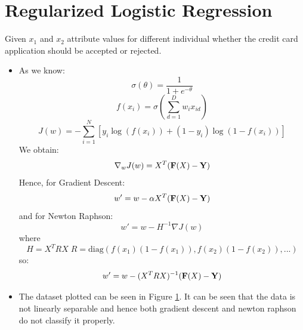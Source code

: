 \documentclass{article}
\begin{document}
\section{Regularized Logistic Regression}
Given $x_1$ and $x_2$ attribute values for different individual whether the credit card application should be accepted or rejected.
\begin{itemize}

\begin{figure}[H]
 \caption{Distribution of the dataset, the positive examples are in blue circles and negative examples in red crossed. The magenta line represents the class boundary obtained using gradient descent (linear classification), similarly the green one for Newton Raphson method.}
 \label{fig:7}
 \end{figure}
 
 \item As we know:
 $$\sigma(\theta) = \frac1{1+e^{-\theta}}$$
 $$f(x_i)=\sigma\left(\sum_{d=1}^Dw_ix_{id}\right)$$
 $$J(w)=-\sum_{i=1}^N[y_i\log(f(x_i))+(1-y_i)\log(1-f(x_i))]$$
 We obtain:
 $$\nabla_wJ(w)=X^T({\bf F}(X)-{\bf Y})$$
 Hence, for Gradient Descent:
 $$w'=w-\alpha X^T({\bf F}(X)-{\bf Y})$$
 and for Newton Raphson:
 $$w' = w-H^{-1}\nabla J(w)$$
 where
 $$H=X^TRX\; R=\text{diag}(f(x_1)(1-f(x_1)), f(x_2)(1-f(x_2)), ...)$$
 so:
 $$w' = w - (X^TRX)^{-1}({\bf F}(X)-{\bf Y})$$
 
\item The dataset plotted can be seen in Figure \ref{fig:7}. It can be seen that the data is not linearly separable and hence both gradient descent and newton raphson do not classify it properly.


\end{itemize}
\end{document}
